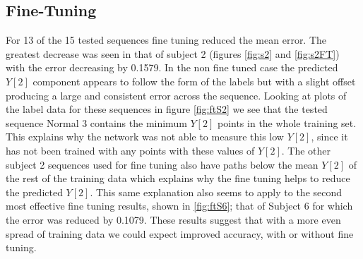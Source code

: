 \documentclass[11pt]{article} %
\begin{document}
\subsection{Fine-Tuning}
\label{sec:finetuning}
For 13 of the 15 tested sequences fine tuning reduced the mean error. The greatest decrease was seen in that of subject 2 (figures \ref{fig:s2} and \ref{fig:s2FT}) with the error decreasing by 0.1579. In the non fine tuned case the predicted $Y[2]$ component appears to follow the form of the labels but with a slight offset producing a large and consistent error across the sequence. Looking at plots of the label data for these sequences in figure \ref{fig:ftS2} we see that the tested sequence Normal 3 contains the minimum $Y[2]$ points in the whole training set. This explains why the network was not able to measure this low $Y[2]$, since it has not been trained with any points with these values of $Y[2]$. The other subject 2 sequences used for fine tuning also have paths below the mean $Y[2]$ of the rest of the training data which explains why the fine tuning helps to reduce the predicted $Y[2]$. This same explanation also seems to apply to the second most effective fine tuning results, shown in \ref{fig:ftS6}; that of Subject 6 for which the error was reduced by 0.1079. These results suggest that with a more even spread of training data we could expect improved accuracy, with or without fine tuning.
\end{document}
